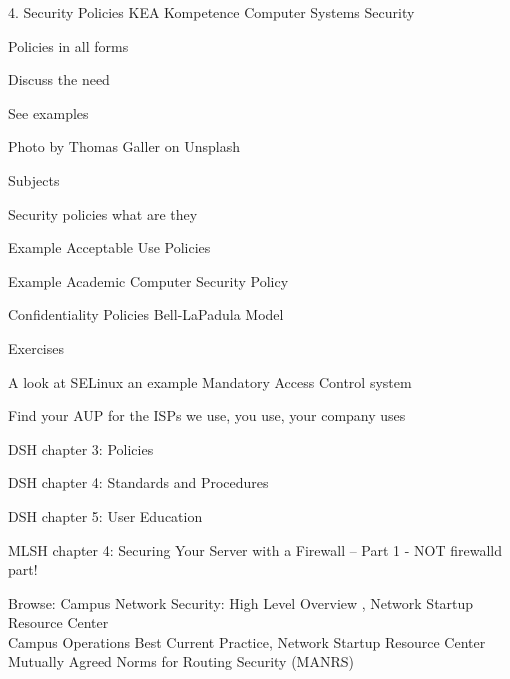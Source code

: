 \documentclass[Screen16to9,17pt]{foils}
\begin{document}
\mytitlepage
{4. Security Policies}
{KEA Kompetence Computer Systems Security \the\year}



 
\begin{list2}
\item Policies in all forms
\item Discuss the need
\item See examples
\end{list2}

{\small\hfill  Photo by Thomas Galler on Unsplash}


\begin{list1}
\item Subjects
\begin{list2}
\item Security policies what are they
  \item Example Acceptable Use Policies
  \item Example Academic Computer Security Policy
  \item Confidentiality Policies Bell-LaPadula Model
\end{list2}
\item Exercises
\begin{list2}
\item A look at SELinux an example Mandatory Access Control system
\item Find your AUP for the ISPs we use, you use, your company uses
\end{list2}
\end{list1}


\begin{list1}
\item DSH chapter 3: Policies
\item DSH chapter 4: Standards and Procedures
\item DSH chapter 5: User Education
\item MLSH chapter 4: Securing Your Server with a
Firewall – Part 1 - NOT firewalld part!

\item Browse: Campus Network Security: High Level Overview , Network Startup Resource Center\\
Campus Operations Best Current Practice, Network Startup Resource Center\\
Mutually Agreed Norms for Routing Security (MANRS)
\end{list1}
\end{document}
